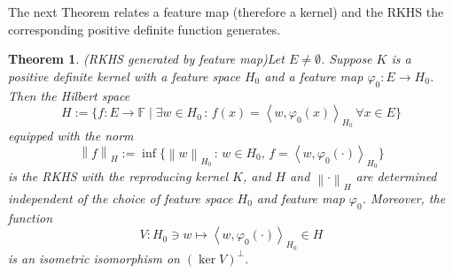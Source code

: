 \documentclass[a4paper,12pt]{article}
\newtheorem{thm}{Theorem}[section]
\theoremstyle{remark}
\theoremstyle{definition}
\theoremstyle{definition}
\theoremstyle{definition}
\newcommand{\ip}[2]{\left<#1, #2 \right>}
\newcommand{\norm}[1]{\left\| #1 \right\|}
\begin{document}
The next Theorem relates a feature map (therefore a kernel) and the RKHS the corresponding positive definite function generates.
\begin{thm} (RKHS generated by feature map)\label{rkhs generated by feature map}
	Let \( E \neq \emptyset \). Suppose \( K \) is a positive definite kernel with a feature space \( H_0 \) and a feature map \( \varphi_0 :E \to H_0 \). Then the Hilbert space
	\begin{equation*}
		H:= \{f:E \to \mathbb{F} \mid \exists w \in H_0 \,:\, f(x)=\ip{w}{\varphi_0(x)}_{H_0}\, \forall x \in E \}
	\end{equation*}
	equipped with the norm
	\begin{equation}\label{norm defined by feature map}
		\norm{f}_H := \inf \{\norm{w}_{H_0} \,:\, w \in H_0,\, f = \ip{w}{\varphi_0(\cdot )}_{H_0}\}
	\end{equation}
	is the RKHS with the reproducing kernel \( K \), and \( H \) and \( \norm{\cdot }_H \) are determined independent of the choice of feature space \( H_0 \) and feature map \( \varphi_0 \). Moreover, the function
	\begin{equation*}
		V : H_0 \ni w \mapsto \ip{w}{\varphi_0(\cdot )}_{H_0} \in H
	\end{equation*}
	is an isometric isomorphism on \( (\ker V)^{\perp} \).
\end{thm}
\end{document}
